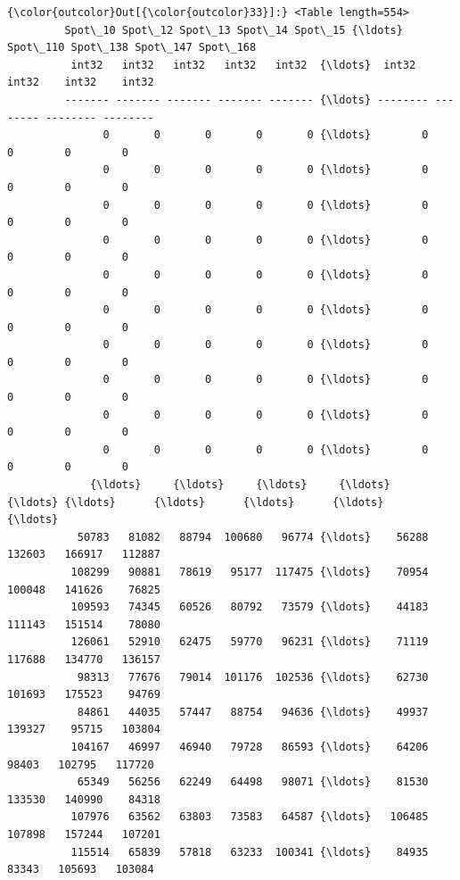 \documentclass[11pt]{article}
\begin{document}
\begin{Verbatim}[commandchars=\\\{\}]
{\color{outcolor}Out[{\color{outcolor}33}]:} <Table length=554>
         Spot\_10 Spot\_12 Spot\_13 Spot\_14 Spot\_15 {\ldots} Spot\_110 Spot\_138 Spot\_147 Spot\_168
          int32   int32   int32   int32   int32  {\ldots}  int32    int32    int32    int32  
         ------- ------- ------- ------- ------- {\ldots} -------- -------- -------- --------
               0       0       0       0       0 {\ldots}        0        0        0        0
               0       0       0       0       0 {\ldots}        0        0        0        0
               0       0       0       0       0 {\ldots}        0        0        0        0
               0       0       0       0       0 {\ldots}        0        0        0        0
               0       0       0       0       0 {\ldots}        0        0        0        0
               0       0       0       0       0 {\ldots}        0        0        0        0
               0       0       0       0       0 {\ldots}        0        0        0        0
               0       0       0       0       0 {\ldots}        0        0        0        0
               0       0       0       0       0 {\ldots}        0        0        0        0
               0       0       0       0       0 {\ldots}        0        0        0        0
             {\ldots}     {\ldots}     {\ldots}     {\ldots}     {\ldots} {\ldots}      {\ldots}      {\ldots}      {\ldots}      {\ldots}
           50783   81082   88794  100680   96774 {\ldots}    56288   132603   166917   112887
          108299   90881   78619   95177  117475 {\ldots}    70954   100048   141626    76825
          109593   74345   60526   80792   73579 {\ldots}    44183   111143   151514    78080
          126061   52910   62475   59770   96231 {\ldots}    71119   117688   134770   136157
           98313   77676   79014  101176  102536 {\ldots}    62730   101693   175523    94769
           84861   44035   57447   88754   94636 {\ldots}    49937   139327    95715   103804
          104167   46997   46940   79728   86593 {\ldots}    64206    98403   102795   117720
           65349   56256   62249   64498   98071 {\ldots}    81530   133530   140990    84318
          107976   63562   63803   73583   64587 {\ldots}   106485   107898   157244   107201
          115514   65839   57818   63233  100341 {\ldots}    84935    83343   105693   103084
\end{Verbatim}
            
\end{document}

